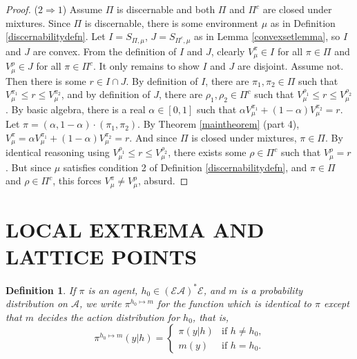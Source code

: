 \documentclass[twoside]{article}
\newtheorem{definition}[theorem]{Definition}
\begin{document}
\begin{proof}
    ($2\Rightarrow 1$)
    Assume $\Pi$ is discernable and both $\Pi$ and $\Pi^c$ are closed under mixtures.
    Since $\Pi$ is discernable, there is some environment $\mu$
    as in Definition \ref{discernabilitydefn}.
    Let $I=S_{\Pi,\mu}$, $J=S_{\Pi^c,\mu}$ as in Lemma \ref{convexsetlemma},
    so $I$ and $J$ are convex.
    From the definition of $I$ and $J$, clearly $V^\pi_\mu\in I$ for all $\pi\in\Pi$
    and $V^\rho_\mu\in J$ for all $\pi\in\Pi^c$. It only remains to show $I$ and $J$
    are disjoint. Assume not. Then there is some $r\in I\cap J$.
    By definition of $I$, there are $\pi_1,\pi_2\in\Pi$ such that
    $V^{\pi_1}_\mu\leq r\leq V^{\pi_2}_\mu$, and by definition of $J$,
    there are $\rho_1,\rho_2\in\Pi^c$ such that $V^{\rho_1}_\mu\leq r\leq V^{\rho_2}_\mu$.
    By basic algebra, there is a real $\alpha\in [0,1]$
    such that $\alpha V^{\pi_1}_\mu + (1-\alpha)V^{\pi_2}_\mu=r$.
    Let $\pi=(\alpha,1-\alpha)\cdot (\pi_1,\pi_2)$.
    By Theorem \ref{maintheorem} (part 4),
    $V^\pi_\mu = \alpha V^{\pi_1}_\mu + (1-\alpha)V^{\pi_2}_\mu=r$.
    And since $\Pi$ is closed under mixtures, $\pi\in\Pi$.
    By identical reasoning using $V^{\rho_1}_\mu\leq r\leq V^{\rho_2}_\mu$,
    there exists some $\rho\in \Pi^c$ such that $V^\rho_\mu=r$.
    But since $\mu$ satisfies condition 2 of
    Definition \ref{discernabilitydefn}, 
    and $\pi\in\Pi$ and $\rho\in\Pi^c$, this forces
    $V^\pi_\mu\not=V^\rho_\mu$, absurd.
\end{proof}

\section{LOCAL EXTREMA AND LATTICE POINTS}

\begin{definition}
\label{modifyagentatoneplace}
    If $\pi$ is an agent, $h_0\in(\mathcal E\mathcal A)^*\mathcal E$,
    and $m$ is a probability distribution on $\mathcal A$,
    we write $\pi^{h_0\mapsto m}$ for the function which is identical to $\pi$
    except that $m$ decides the action distribution for
    $h_0$, that is,
    \[
        \pi^{h_0\mapsto m}(y|h)
        =
        \begin{cases}
            \pi(y|h) &\mbox{if $h\not=h_0$,}\\
            m(y) &\mbox{if $h=h_0$.}
        \end{cases}
    \]
\end{definition}
\end{document}
